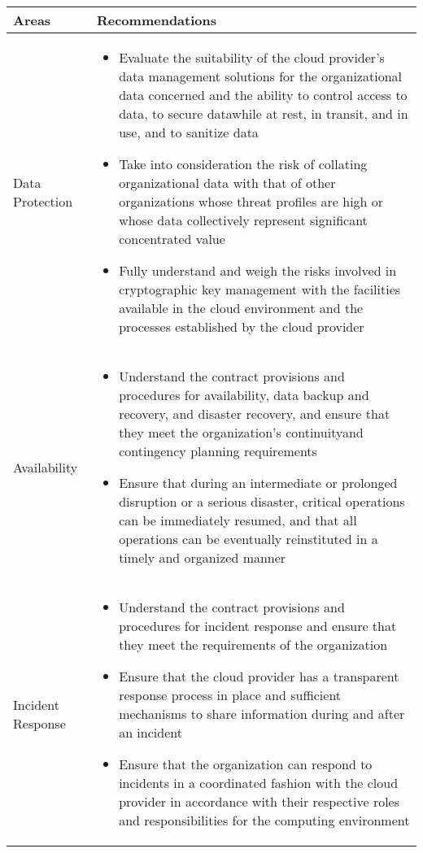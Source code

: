 \begin{center}
    \begin{tabular}{p{3cm} | p{12cm}}
        \bfseries{Areas} & \bfseries{Recommendations}\\ \hline
        Data Protection &
        \begin{itemize}
            \item Evaluate the suitability of the cloud provider's data management solutions for the organizational data concerned and the ability to control access to data, to secure datawhile at rest, in transit, and in use, and to sanitize data
            \item Take into consideration the risk of collating organizational data with that of other organizations whose threat profiles are high or whose data collectively represent significant concentrated value
            \item Fully understand and weigh the risks involved in cryptographic key management with the facilities available in the cloud environment and the processes established by the cloud provider
        \end{itemize}\\
        Availability &
        \begin{itemize}
            \item Understand the contract provisions and procedures for availability, data backup and recovery, and disaster recovery, and ensure that they meet the organization's continuityand contingency planning requirements
            \item Ensure that during an intermediate or prolonged disruption or a serious disaster, critical operations can be immediately resumed, and that all operations can be eventually reinstituted in a timely and organized manner
        \end{itemize}\\
        Incident Response &
        \begin{itemize}
            \item Understand the contract provisions and procedures for incident response and ensure that they meet the requirements of the organization
            \item Ensure that the cloud provider has a transparent response process in place and sufficient mechanisms to share information during and after an incident
            \item Ensure that the organization can respond to incidents in a coordinated fashion with the cloud provider in accordance with their respective roles and responsibilities for the computing environment
        \end{itemize}
    \end{tabular}
\end{center}

